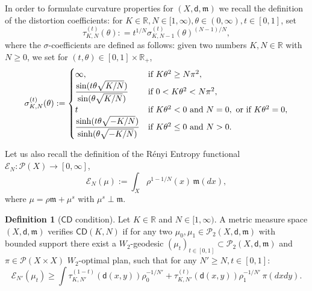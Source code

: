 \documentclass[a4paper]{amsart}
\theoremstyle{plain}
\theoremstyle{definition}
\newtheorem{definition}[lemma]{Definition}
\numberwithin{equation}{section}
\newcommand{\R}{\mathbb{R}}
\newcommand{\CD}{\mathsf{CD}}
\newcommand{\mm}{\mathfrak m}
\newcommand{\sfd}{\mathsf d}
\newcommand{\cP}{\mathcal P}
\begin{document}
{{In order to formulate curvature properties for $(X,\sfd,\mm)$  we recall the definition of the  distortion coefficients:  for $K\in \R, N\in [1,\infty), \theta \in (0,\infty), t\in [0,1]$, set 
\begin{equation}\label{eq:deftau}
\tau_{K,N}^{(t)}(\theta): = t^{1/N} \sigma_{K,N-1}^{(t)}(\theta)^{(N-1)/N},
\end{equation}
where the $\sigma$-coefficients are defined 
as follows:
given two numbers $K,N\in \R$ with $N\geq0$, we set for $(t,\theta) \in[0,1] \times \R_{+}$, 
%
\begin{equation}\label{eq:Defsigma}
\sigma_{K,N}^{(t)}(\theta):= 
%
\begin{cases}
%
\infty, & \textrm{if}\ K\theta^{2} \geq N\pi^{2}, \crcr
%
\displaystyle  \frac{\sin(t\theta\sqrt{K/N})}{\sin(\theta\sqrt{K/N})} & \textrm{if}\ 0< K\theta^{2} <  N\pi^{2}, \crcr
%
t & \textrm{if}\ K \theta^{2}<0 \ \textrm{and}\ N=0, \ \textrm{or  if}\ K \theta^{2}=0,  \crcr
%
\displaystyle   \frac{\sinh(t\theta\sqrt{-K/N})}{\sinh(\theta\sqrt{-K/N})} & \textrm{if}\ K\theta^{2} \leq 0 \ \textrm{and}\ N>0.
%
\end{cases}
%
\end{equation}





\noindent
Let us also recall the definition of the R\'enyi Entropy functional ${\mathcal E}_{N} : \cP(X) \to [0, \infty]$, 
%
\begin{equation}\label{eq:defEnt}
{\mathcal E}_{N}(\mu)  := \int_{X} \rho^{1-1/N}(x) \,\mm(dx),
\end{equation}
%
where $\mu = \rho \mm + \mu^{s}$ with $\mu^{s}\perp \mm$.
\medskip

\begin{definition}[$\CD$ condition]\label{def:CD}
Let $K \in \R$ and $N \in [1,\infty)$. A metric measure space  $(X,\sfd,\mm)$ verifies $\CD(K,N)$ if for any two $\mu_{0},\mu_{1} \in \cP_{2}(X,\sfd,\mm)$ 
with bounded support there exist a $W_{2}$-geodesic $(\mu_{t})_{t\in [0,1]}\subset \cP_{2}(X,\sfd,\mm)$ and  $\pi\in \cP(X\times X)$ $W_{2}$-optimal plan, such that for any $N'\geq N, t\in [0,1]$:
%
\begin{equation}\label{eq:defCD}
{\mathcal E}_{N'}(\mu_{t}) \geq \int \tau_{K,N'}^{(1-t)} (\sfd(x,y)) \rho_{0}^{-1/N'} 
+ \tau_{K,N'}^{(t)} (\sfd(x,y)) \rho_{1}^{-1/N'} \,\pi(dxdy).
\end{equation}
\end{definition}

}}
\end{document}
